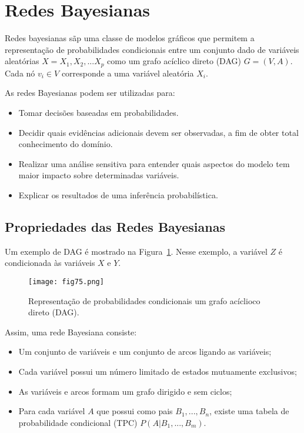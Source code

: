 \section{Redes Bayesianas}

Redes bayesianas sãp uma classe de modelos gráficos que permitem a representação de probabilidades condicionais entre um conjunto dado de variáveis aleatórias $X = {X_1,X_2,...X_p}$ como um grafo acíclico direto (DAG) $G = (V,A)$. Cada nó $v_i \in V$ corresponde a uma variável aleatória $X_i$.

As redes Bayesianas podem ser utilizadas para:
    
    \begin{itemize}
        \item Tomar decisões baseadas em probabilidades.
        \item Decidir quais evidências adicionais devem ser observadas, a fim de obter total conhecimento do domínio.
        \item Realizar uma análise sensitiva para entender quais aspectos do modelo tem maior impacto sobre determinadas variáveis.
        \item Explicar os resultados de uma inferência probabilística.
\end{itemize}
    
\subsection{Propriedades das Redes Bayesianas}

Um exemplo de DAG é mostrado na Figura~\ref{fig:fig75}. Nesse exemplo, a variável $Z$ é condicionada às variáveis $X$ e $Y$.

\begin{figure}[t]
    \texttt{[image: fig75.png]}
    \centering
    \caption{Representação de probabilidades condicionais um grafo acíclioco direto (DAG).}
    \label{fig:fig75}
\end{figure}

Assim, uma rede Bayesiana consiste:

\begin{itemize}
    \item Um conjunto de variáveis e um conjunto de arcos ligando as variáveis;
    \item Cada variável possui um número limitado de estados mutuamente exclusivos;
    \item As variáveis e arcos formam um grafo dirigido e sem ciclos;
    \item Para cada variável $A$ que possui como pais $B_1, ..., B_n$, existe uma tabela de probabilidade condicional (TPC) $P(A|B_1, ..., B_m)$.
\end{itemize}

